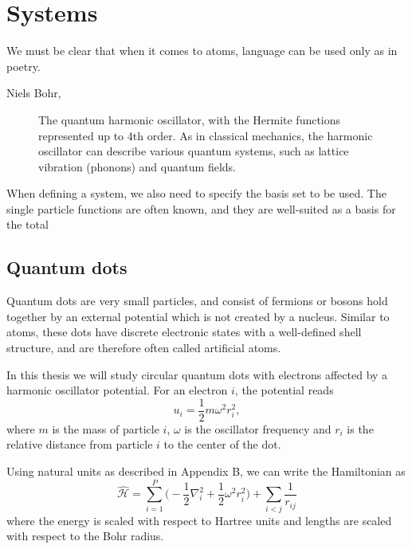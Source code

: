 \chapter{Systems} \label{chp:systems}
\epigraph{We must be clear that when it comes to atoms, language can be used only as in poetry.}{Niels Bohr, \cite{heisenberg_physics_1971}}
\begin{figure}[H]
	\centering
	
	\caption{The quantum harmonic oscillator, with the Hermite functions represented up to 4th order. As in classical mechanics, the harmonic oscillator can describe various quantum systems, such as lattice vibration (phonons) and quantum fields.}
	\label{fig:harmonicoscillator}
\end{figure}

When defining a system, we also need to specify the basis set to be used. The single particle functions are often known, and they are well-suited as a basis for the total

\newpage
\section{Quantum dots} \label{sec:quantumdots}
Quantum dots are very small particles, and consist of fermions or bosons hold together by an external potential which is not created by a nucleus. Similar to atoms, these dots have discrete electronic states with a well-defined shell structure, and are therefore often called artificial atoms. 

In this thesis we will study circular quantum dots with electrons affected by a harmonic oscillator potential. For an electron $i$, the potential reads
\begin{equation}
u_i=\frac{1}{2}m\omega^2r_i^2,
\end{equation}
where $m$ is the mass of particle $i$, $\omega$ is the oscillator frequency and $r_i$ is the relative distance from particle $i$ to the center of the dot. 

Using natural units as described in Appendix B, we can write the Hamiltonian as
\begin{equation}
\label{eq:HOHamiltonian}
\hat{\mathcal{H}} = \sum_{i=1}^{P} \Big(-\frac{1}{2} \nabla_i^2 + \frac{1}{2} \omega^2r_i ^2\Big) + \sum_{i<j} \frac{1}{r_{ij}} 
\end{equation}
where the energy is scaled with respect to Hartree units and lengths are scaled with respect to the Bohr radius.

